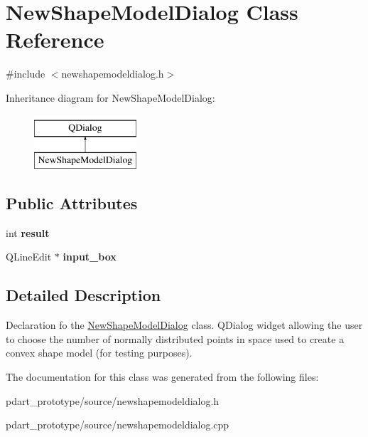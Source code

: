 \hypertarget{class_new_shape_model_dialog}{}\section{New\+Shape\+Model\+Dialog Class Reference}
\label{class_new_shape_model_dialog}


{\ttfamily \#include $<$newshapemodeldialog.\+h$>$}

Inheritance diagram for New\+Shape\+Model\+Dialog\+:\begin{figure}[H]
\begin{center}
\leavevmode
\includegraphics[height=2.000000cm]{class_new_shape_model_dialog}
\end{center}
\end{figure}
\subsection*{Public Attributes}
\begin{DoxyCompactItemize}
\item 
int {\bfseries result}\hypertarget{class_new_shape_model_dialog_acbc0ee2cc93250045f7a1daf7c529de7}{}\label{class_new_shape_model_dialog_acbc0ee2cc93250045f7a1daf7c529de7}

\item 
Q\+Line\+Edit $\ast$ {\bfseries input\+\_\+box}\hypertarget{class_new_shape_model_dialog_abe6e49d9fd8f520ad50aad134ab405c2}{}\label{class_new_shape_model_dialog_abe6e49d9fd8f520ad50aad134ab405c2}

\end{DoxyCompactItemize}


\subsection{Detailed Description}
Declaration fo the \hyperlink{class_new_shape_model_dialog}{New\+Shape\+Model\+Dialog} class. Q\+Dialog widget allowing the user to choose the number of normally distributed points in space used to create a convex shape model (for testing purposes). 

The documentation for this class was generated from the following files\+:\begin{DoxyCompactItemize}
\item 
pdart\+\_\+prototype/source/newshapemodeldialog.\+h\item 
pdart\+\_\+prototype/source/newshapemodeldialog.\+cpp\end{DoxyCompactItemize}
